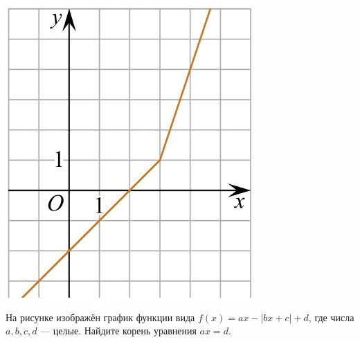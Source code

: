 \begin{homework}[number=2]
\begin{listofex}
\begin{minipage}[c]{0.1\textwidth}
			\includegraphics[align=t, width=\textwidth]{../pics/G101M4C5-8.jpg}
		\end{minipage}
		\item
		\begin{minipage}[t]{0.43\textwidth}
			На рисунке изображён график функции вида \(f(x)=ax-|bx+c|+d\), где числа \(a, b, c, d\) --- целые. Найдите корень уравнения \(ax=d\).
		\end{minipage}
		\begin{minipage}[c]{0.1\textwidth}

\end{minipage}
\end{listofex}
\end{homework}
